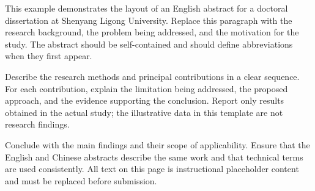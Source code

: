 \begin{abstract}
本文件展示沈阳理工大学博士学位论文中文摘要的排版方式。此处应概括研究背景、需要解决的科学或工程问题以及开展研究的意义。摘要应当能够独立阅读，避免将目录、章节安排或未经解释的缩写直接作为摘要内容。

第二段可说明研究对象、基本假设与总体方法，并围绕主要贡献组织文字。对于每项贡献，建议说明已有方法的局限、本文提出的方法以及得到的主要结论。实验结果应来自真实研究，不能沿用模板中的示例数据。

最后可总结研究结论和适用范围。中文摘要与英文摘要应在研究内容、贡献和结论上相互对应。关键词应准确反映论文主题，具体数量和摘要篇幅请按学校最新要求核对。本段及前述文字均为写作提示，提交前应全部替换。
\end{abstract}

\begin{enabstract}
This example demonstrates the layout of an English abstract for a doctoral dissertation at Shenyang Ligong University. Replace this paragraph with the research background, the problem being addressed, and the motivation for the study. The abstract should be self-contained and should define abbreviations when they first appear.

Describe the research methods and principal contributions in a clear sequence. For each contribution, explain the limitation being addressed, the proposed approach, and the evidence supporting the conclusion. Report only results obtained in the actual study; the illustrative data in this template are not research findings.

Conclude with the main findings and their scope of applicability. Ensure that the English and Chinese abstracts describe the same work and that technical terms are used consistently. All text on this page is instructional placeholder content and must be replaced before submission.
\end{enabstract}
